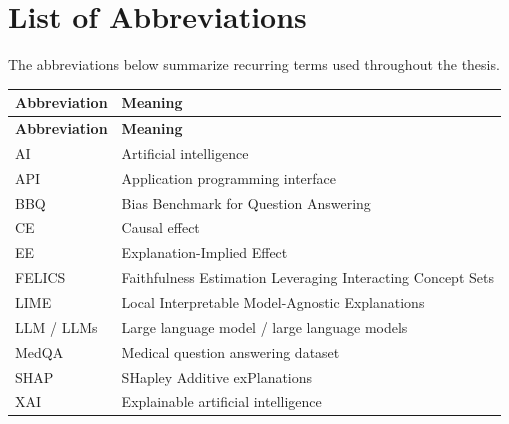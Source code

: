 \chapter*{List of Abbreviations}

The abbreviations below summarize recurring terms used throughout the thesis.

\begin{longtable}{@{}>{\raggedright\arraybackslash}p{} p{}@{}}
	\textbf{Abbreviation} & \textbf{Meaning}                                            \\
	\hline
	\endfirsthead
	\textbf{Abbreviation} & \textbf{Meaning}                                            \\
	\hline
	\endhead

	AI                    & Artificial intelligence                                     \\
	API                   & Application programming interface                           \\
	BBQ                   & Bias Benchmark for Question Answering                       \\
	CE                    & Causal effect                                               \\
	EE                    & Explanation-Implied Effect                                  \\
	FELICS                & Faithfulness Estimation Leveraging Interacting Concept Sets \\
	LIME                  & Local Interpretable Model-Agnostic Explanations             \\
	LLM / LLMs            & Large language model / large language models                \\
	MedQA                 & Medical question answering dataset                          \\
	SHAP                  & SHapley Additive exPlanations                               \\
	XAI                   & Explainable artificial intelligence                         \\
\end{longtable}
